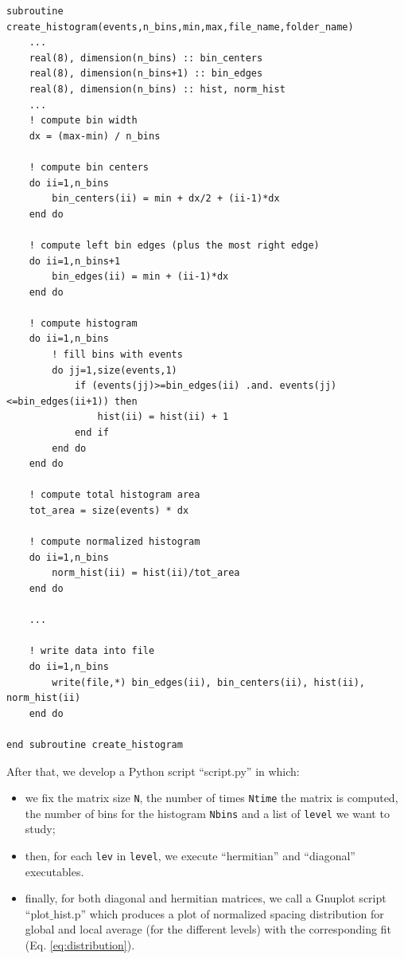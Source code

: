 \documentclass[rmp,10pt,onecolumn,fleqn,notitlepage]{revtex4-1}
\begin{document}
\begin{minipage}[t]{0.85\linewidth}%
\begin{lstlisting}[style=Fortran]
subroutine create_histogram(events,n_bins,min,max,file_name,folder_name)
    ...
    real(8), dimension(n_bins) :: bin_centers
    real(8), dimension(n_bins+1) :: bin_edges
    real(8), dimension(n_bins) :: hist, norm_hist
    ...
    ! compute bin width
    dx = (max-min) / n_bins

    ! compute bin centers
    do ii=1,n_bins
        bin_centers(ii) = min + dx/2 + (ii-1)*dx
    end do

    ! compute left bin edges (plus the most right edge)
    do ii=1,n_bins+1
        bin_edges(ii) = min + (ii-1)*dx
    end do

    ! compute histogram
    do ii=1,n_bins
        ! fill bins with events
        do jj=1,size(events,1)
            if (events(jj)>=bin_edges(ii) .and. events(jj)<=bin_edges(ii+1)) then
                hist(ii) = hist(ii) + 1
            end if
        end do
    end do

    ! compute total histogram area
    tot_area = size(events) * dx

    ! compute normalized histogram
    do ii=1,n_bins
        norm_hist(ii) = hist(ii)/tot_area
    end do

    ...

    ! write data into file
    do ii=1,n_bins
        write(file,*) bin_edges(ii), bin_centers(ii), hist(ii), norm_hist(ii)
    end do

end subroutine create_histogram\end{lstlisting}
\end{minipage}

After that, we develop a Python script “script.py” in which:
\begin{itemize}
\item we fix the matrix size \texttt{N}, the number of times \texttt{Ntime} the matrix is computed, the number of bins for the histogram \texttt{Nbins} and a list of \texttt{level} we want to study;

\item then, for each \texttt{lev} in \texttt{level}, we execute “hermitian” and “diagonal” executables.

\item finally, for both diagonal and hermitian matrices, we call a Gnuplot script “plot$\_$hist.p” which produces a plot of normalized spacing distribution for global and local average (for the different levels) with the corresponding fit (Eq. \eqref{eq:distribution}).
\end{itemize}
\end{document}
